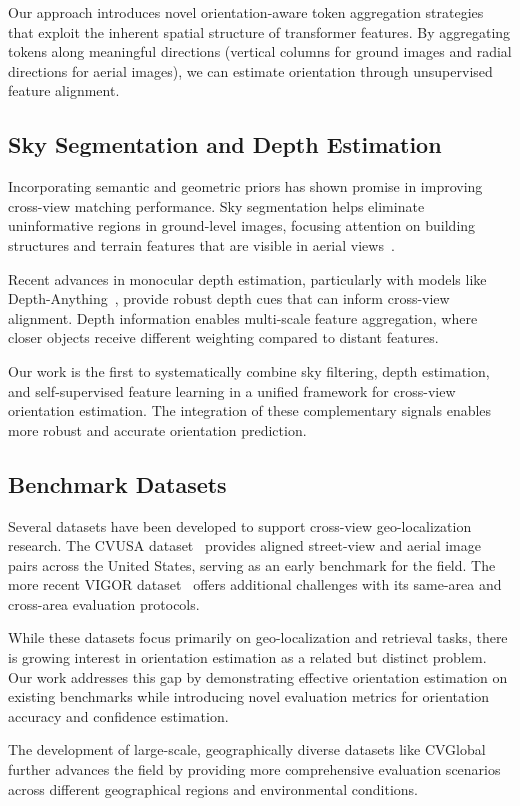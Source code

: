 Our approach introduces novel orientation-aware token aggregation strategies that exploit the inherent spatial structure of transformer features. By aggregating tokens along meaningful directions (vertical columns for ground images and radial directions for aerial images), we can estimate orientation through unsupervised feature alignment.

\subsection{Sky Segmentation and Depth Estimation}

Incorporating semantic and geometric priors has shown promise in improving cross-view matching performance. Sky segmentation helps eliminate uninformative regions in ground-level images, focusing attention on building structures and terrain features that are visible in aerial views~\cite{workman2015predicting}.

Recent advances in monocular depth estimation, particularly with models like Depth-Anything~\cite{yang2024depth}, provide robust depth cues that can inform cross-view alignment. Depth information enables multi-scale feature aggregation, where closer objects receive different weighting compared to distant features.

Our work is the first to systematically combine sky filtering, depth estimation, and self-supervised feature learning in a unified framework for cross-view orientation estimation. The integration of these complementary signals enables more robust and accurate orientation prediction.

\subsection{Benchmark Datasets}

Several datasets have been developed to support cross-view geo-localization research. The CVUSA dataset~\cite{workman2015predicting} provides aligned street-view and aerial image pairs across the United States, serving as an early benchmark for the field. The more recent VIGOR dataset~\cite{zhu2021vigor} offers additional challenges with its same-area and cross-area evaluation protocols.

While these datasets focus primarily on geo-localization and retrieval tasks, there is growing interest in orientation estimation as a related but distinct problem. Our work addresses this gap by demonstrating effective orientation estimation on existing benchmarks while introducing novel evaluation metrics for orientation accuracy and confidence estimation.

The development of large-scale, geographically diverse datasets like CVGlobal further advances the field by providing more comprehensive evaluation scenarios across different geographical regions and environmental conditions.